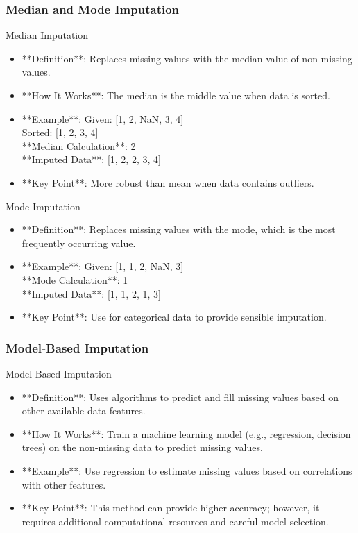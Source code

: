 \documentclass[aspectratio=169]{beamer}
\begin{document}
\begin{frame}[fragile]
    \frametitle{Median and Mode Imputation}
    \begin{block}{Median Imputation}
        \begin{itemize}
            \item **Definition**: Replaces missing values with the median value of non-missing values.
            \item **How It Works**: The median is the middle value when data is sorted.
            \item **Example**: Given: [1, 2, NaN, 3, 4] \\
            Sorted: [1, 2, 3, 4] \\
            **Median Calculation**: 2 \\
            **Imputed Data**: [1, 2, 2, 3, 4]
            \item **Key Point**: More robust than mean when data contains outliers.
        \end{itemize}
    \end{block}
    
    \begin{block}{Mode Imputation}
        \begin{itemize}
            \item **Definition**: Replaces missing values with the mode, which is the most frequently occurring value.
            \item **Example**: Given: [1, 1, 2, NaN, 3] \\
            **Mode Calculation**: 1 \\
            **Imputed Data**: [1, 1, 2, 1, 3]
            \item **Key Point**: Use for categorical data to provide sensible imputation.
        \end{itemize}
    \end{block}
\end{frame}

\begin{frame}[fragile]
    \frametitle{Model-Based Imputation}
    \begin{block}{Model-Based Imputation}
        \begin{itemize}
            \item **Definition**: Uses algorithms to predict and fill missing values based on other available data features.
            \item **How It Works**: Train a machine learning model (e.g., regression, decision trees) on the non-missing data to predict missing values.
            \item **Example**: Use regression to estimate missing values based on correlations with other features.
            \item **Key Point**: This method can provide higher accuracy; however, it requires additional computational resources and careful model selection.
        \end{itemize}
    \end{block}
\end{frame}
\end{document}
